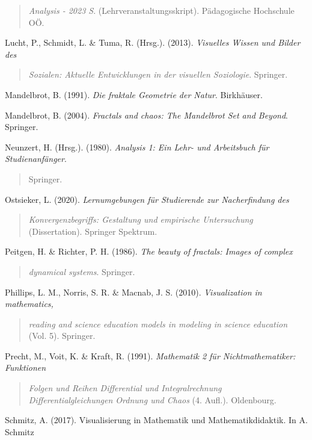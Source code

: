 \documentclass{book}
\begin{document}
\begin{quote}
\emph{Analysis - 2023 S}. (Lehrveranstaltungsskript). Pädagogische
Hochschule OÖ.
\end{quote}

Lucht, P., Schmidt, L. \& Tuma, R. (Hrsg.). (2013). \emph{Visuelles
Wissen und Bilder des}

\begin{quote}
\emph{Sozialen: Aktuelle Entwicklungen in der visuellen Soziologie}.
Springer.
\end{quote}

Mandelbrot, B. (1991). \emph{Die fraktale Geometrie der Natur}.
Birkhäuser.

Mandelbrot, B. (2004). \emph{Fractals and chaos: The Mandelbrot Set and
Beyond}. Springer.

Neunzert, H. (Hrsg.). (1980). \emph{Analysis 1: Ein Lehr- und
Arbeitsbuch für Studienanfänger}.

\begin{quote}
Springer.
\end{quote}

Ostsieker, L. (2020). \emph{Lernumgebungen für Studierende zur
Nacherfindung des}

\begin{quote}
\emph{Konvergenzbegriffs: Gestaltung und empirische Untersuchung}
(Dissertation). Springer Spektrum.
\end{quote}

Peitgen, H. \& Richter, P. H. (1986). \emph{The beauty of fractals:
Images of complex}

\begin{quote}
\emph{dynamical systems}. Springer.
\end{quote}

Phillips, L. M., Norris, S. R. \& Macnab, J. S. (2010).
\emph{Visualization in mathematics,}

\begin{quote}
\emph{reading and science education models in modeling in science
education} (Vol. 5). Springer.
\end{quote}

Precht, M., Voit, K. \& Kraft, R. (1991). \emph{Mathematik 2 für
Nichtmathematiker: Funktionen}

\begin{quote}
\emph{Folgen und Reihen Differential und Integralrechnung
Differentialgleichungen Ordnung und Chaos} (4. Aufl.). Oldenbourg.
\end{quote}

Schmitz, A. (2017). Visualisierung in Mathematik und Mathematikdidaktik.
In A. Schmitz
\end{document}
